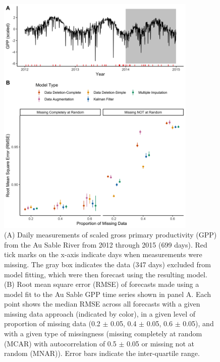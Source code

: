 \documentclass{article}
\begin{document}
\begin{figure}
    \centering
    \noindent\includegraphics[width = 0.85\textwidth]{Figures/MockedUpFigures/RMSE_FullFigure_NoLineWithErrorBar_gaussian_auSable.png}
    \caption{(A) Daily measurements of scaled gross primary productivity (GPP) from the Au Sable River from 2012 through 2015 (699 days). Red tick marks on the x-axis indicate days when measurements were missing. The gray box indicates the data (347 days) excluded from model fitting, which were then forecast using the resulting model. (B) Root mean square error (RMSE) of forecasts made using a model fit to the Au Sable GPP time series shown in panel A. Each point shows the median RMSE across all forecasts with a given missing data approach (indicated by color), in a given level of proportion of missing data (0.2 $\pm$ 0.05, 0.4 $\pm$ 0.05, 0.6 $\pm$ 0.05), and with a given type of missingness (missing completely at random (MCAR) with autocorrelation of 0.5 $\pm$ 0.05 or missing not at random (MNAR)). Error bars indicate the inter-quartile range.}
    \label{fig:RMSE_Gaus}
\end{figure}
\end{document}
